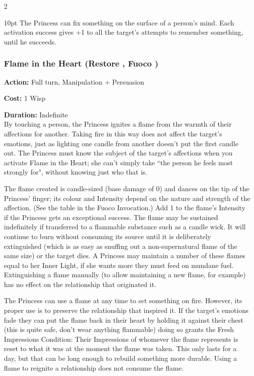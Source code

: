 \begin{multicols}{2}
\begin{myindentpar}{10pt}
The Princess can fix something on the surface of a person's mind. Each activation success gives +1 to all the target's attempts to remember something, until he succeeds.\end{myindentpar}

\subsubsection*{Flame in the Heart (Restore \textbullet\textbullet, Fuoco \textbullet)}

\noindent \textbf{Action:} Full turn, Manipulation + Persuasion

\noindent \textbf{Cost:} 1 Wisp

\noindent \textbf{Duration:} Indefinite \\

\noindent By touching a person, the Princess ignites a flame from the warmth of their affections for another. Taking fire in this way does not affect the target's emotions, just as lighting one candle from another doesn't put the first candle out. The Princess must know the subject of the target's affections when you activate Flame in the Heart; she can't simply take \textquotedblleft the person he feels most strongly for", without knowing just who that is.

The flame created is candle-sized (base damage of 0) and dances on the tip of the Princess' finger; its colour and Intensity depend on the nature and strength of the affection. (See the table in the Fuoco Invocation.) Add 1 to the flame's Intensity if the Princess gets an exceptional success. The flame may be sustained indefinitely if transferred to a flammable substance such as a candle wick. It will continue to burn without consuming its source until it is deliberately extinguished (which is as easy as snuffing out a non-supernatural flame of the same size) or the target dies. A Princess may maintain a number of these flames equal to her Inner Light, if she wants more they must feed on mundane fuel. Extinguishing a flame manually (to allow maintaining a new flame, for example) has no effect on the relationship that originated it.

The Princess can use a flame at any time to set something on fire. However, its proper use is to preserve the relationship that inspired it. If the target's emotions fade they can put the flame back in their heart by holding it against their chest (this is quite safe, don't wear anything flammable) doing so grants the Fresh Impressions Condition: Their Impressions of whomever the flame represents is reset to what it was at the moment the flame was taken. This only lasts for a day, but that can be long enough to rebuild something more durable. Using a flame to reignite a relationship does not consume the flame.


\end{multicols}
